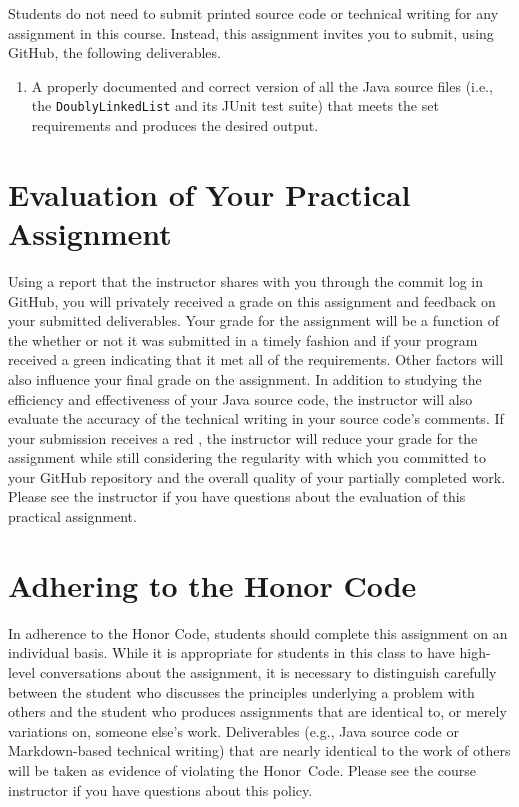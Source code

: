 \documentclass[11pt]{article}
\newcommand{\mainprogram}{\lstinline{DoublyLinkedList}}
\newcommand{\checkmark}{\ding{51}}
\newcommand{\naughtmark}{\ding{55}}
\begin{document}
\noindent Students do not need to submit printed source code or technical
writing for any assignment in this course. Instead, this assignment invites you
to submit, using GitHub, the following deliverables.

\begin{enumerate}

  \setlength{\itemsep}{0in}

\item A properly documented and correct version of all the Java source files
  (i.e., the \mainprogram{} and its JUnit test suite) that meets the set
  requirements and produces the desired output.

\end{enumerate}

\section*{Evaluation of Your Practical Assignment}

Using a report that the instructor shares with you through the commit log in
GitHub, you will privately received a grade on this assignment and feedback on
your submitted deliverables. Your grade for the assignment will be a function of
the whether or not it was submitted in a timely fashion and if your program
received a green \checkmark{} indicating that it met all of the requirements.
Other factors will also influence your final grade on the assignment. In
addition to studying the efficiency and effectiveness of your Java source code,
the instructor will also evaluate the accuracy of the technical writing in your
source code's comments. If your submission receives a red \naughtmark{}, the
instructor will reduce your grade for the assignment while still considering the
regularity with which you committed to your GitHub repository and the overall
quality of your partially completed work. Please see the instructor if you have
questions about the evaluation of this practical assignment.

\section*{Adhering to the Honor Code}

In adherence to the Honor Code, students should complete this assignment on an
individual basis. While it is appropriate for students in this class to have
high-level conversations about the assignment, it is necessary to distinguish
carefully between the student who discusses the principles underlying a problem
with others and the student who produces assignments that are identical to, or
merely variations on, someone else's work. Deliverables (e.g., Java source code
or Markdown-based technical writing) that are nearly identical to the work of
others will be taken as evidence of violating the \mbox{Honor Code}. Please see
the course instructor if you have questions about this policy.
\end{document}
